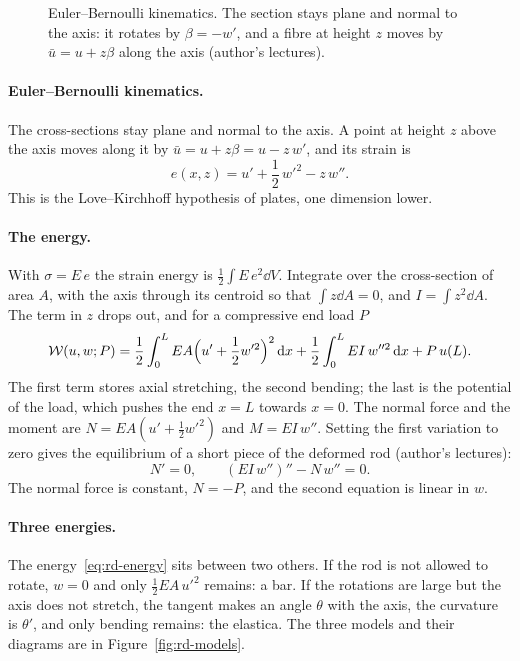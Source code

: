 \begin{figure}[ht]
  \centering
  
  \caption{Euler--Bernoulli kinematics. The section stays plane and normal to the axis: it
    rotates by $\beta = -w'$, and a fibre at height $z$ moves by $\bar u = u + z\beta$ along the axis
    (author's lectures).}
  \label{fig:rd-fibre}
\end{figure}

\paragraph{Euler--Bernoulli kinematics.}
The cross-sections stay plane and normal to the axis. A point at height $z$ above the axis
moves along it by $\bar u = u + z\beta = u - z\,w'$, and its strain is
\begin{equation}\label{eq:rd-strain}
  e(x,z) = u' + \frac12\,w'^2 - z\,w'' .
\end{equation}
This is the Love--Kirchhoff hypothesis of plates, one dimension lower.

\paragraph{The energy.}
With $\sigma = E\,e$ the strain energy is $\displaystyle\frac12\int E\,e^2\dd V$. Integrate over the
cross-section of area $A$, with the axis through its centroid so that $\displaystyle\int z\dd A = 0$,
and $I = \displaystyle\int z^2\dd A$. The term in $z$ drops out, and for a compressive end load $P$
\begin{equation}\label{eq:rd-energy}
  \mathcal{W}(u,w;P) = \frac12\int_0^L EA\Bigl(u' + \frac12 w'^2\Bigr)^2\,\mathrm{d} x
  + \frac12\int_0^L EI\,w''^2\,\mathrm{d} x + P\,u(L) .
\end{equation}
The first term stores axial stretching, the second bending; the last is the potential of
the load, which pushes the end $x = L$ towards $x = 0$. The normal force and the moment are
$N = EA(u' + \tfrac12 w'^2)$ and $M = EI\,w''$. Setting the first variation to zero gives the
equilibrium of a short piece of the deformed rod (author's lectures):
\begin{equation}\label{eq:rd-equil}
  N' = 0, \qquad (EI\,w'')'' - N\,w'' = 0 .
\end{equation}
The normal force is constant, $N = -P$, and the second equation is linear in $w$.

\paragraph{Three energies.}
The energy~\eqref{eq:rd-energy} sits between two others. If the rod is not allowed to
rotate, $w = 0$ and only $\tfrac12 EA\,u'^2$ remains: a bar. If the rotations are large but the
axis does not stretch, the tangent makes an angle $\theta$ with the axis, the curvature is
$\theta'$, and only bending remains: the elastica. The three models and their diagrams are in
Figure~\ref{fig:rd-models}.

